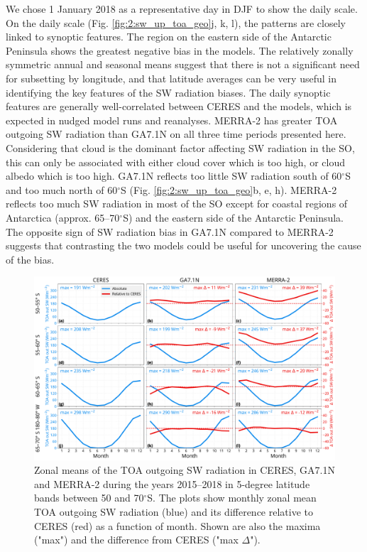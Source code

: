 We chose 1 January 2018 as a representative day in DJF to show the daily scale.
On the daily scale (Fig. \ref{fig:2:sw_up_toa_geo}j, k, l), the patterns are
closely linked to synoptic features. The region on the eastern side of the
Antarctic Peninsula shows the greatest negative bias in the models. The
relatively zonally symmetric annual and seasonal means suggest that there is
not a significant need for subsetting by longitude, and that latitude averages
can be very useful in identifying the key features of the SW radiation biases.
The daily synoptic features are generally well-correlated between CERES and the
models, which is expected in nudged model runs and reanalyses. MERRA-2 has
greater TOA outgoing SW radiation than GA7.1N on all three time periods
presented here. Considering that cloud is the dominant factor affecting SW
radiation in the SO, this can only be associated with either cloud cover which
is too high, or cloud albedo which is too high. GA7.1N reflects too little SW
radiation south of 60$^\circ$S and too much north of 60$^\circ$S (Fig.
\ref{fig:2:sw_up_toa_geo}b, e, h). MERRA-2 reflects too much SW radiation in most
of the SO except for coastal regions of Antarctica (approx. 65--70$^\circ$S)
and the eastern side of the Antarctic Peninsula. The opposite sign of SW
radiation bias in GA7.1N compared to MERRA-2 suggests that contrasting the two
models could be useful for uncovering the cause of the bias.

\begin{figure}[t]
\centering
\includegraphics[width=\textwidth]{chapter2/fig/sw_up_toa_time_rev1.pdf}
\caption[Zonal means of the TOA outgoing SW radiation in CERES, GA7.1N and MERRA-2]{
Zonal means of the TOA outgoing SW radiation in CERES, GA7.1N and MERRA-2
during the years 2015--2018 in 5-degree latitude bands between 50 and
70$^\circ$S. The plots show monthly zonal mean TOA outgoing SW radiation
(blue) and its difference relative to CERES (red) as a function of month. Shown
are also the maxima ("max") and the difference from CERES ("max $\Delta$").
}
\label{fig:2:sw_up_toa_time}
\end{figure}

